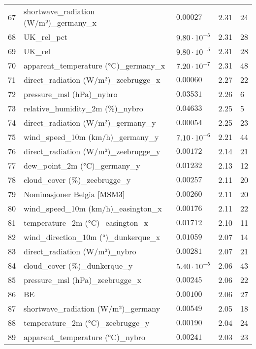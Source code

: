 \begin{table}[H]
\begin{tabular}{r l l l l}
        67 & shortwave\_radiation (W/m²)\_germany\_x & $0.00027$ & 2.31 & 24 \\
        68 & UK\_rel\_pct & $9.80 \cdot 10^{-5}$ & 2.31 & 28 \\
        69 & UK\_rel & $9.80 \cdot 10^{-5}$ & 2.31 & 28 \\
        70 & apparent\_temperature (°C)\_germany\_x & $7.20 \cdot 10^{-7}$ & 2.31 & 48 \\
        71 & direct\_radiation (W/m²)\_zeebrugge\_x & $0.00060$ & 2.27 & 22 \\
        72 & pressure\_msl (hPa)\_nybro & $0.03531$ & 2.26 & 6 \\
        73 & relative\_humidity\_2m (\%)\_nybro & $0.04633$ & 2.25 & 5 \\
        74 & direct\_radiation (W/m²)\_germany\_y & $0.00054$ & 2.25 & 23 \\
        75 & wind\_speed\_10m (km/h)\_germany\_y & $7.10 \cdot 10^{-6}$ & 2.21 & 44 \\
        76 & direct\_radiation (W/m²)\_zeebrugge\_y & $0.00172$ & 2.14 & 21 \\
        77 & dew\_point\_2m (°C)\_germany\_y & $0.01232$ & 2.13 & 12 \\
        78 & cloud\_cover (\%)\_zeebrugge\_y & $0.00257$ & 2.11 & 20 \\
        79 & Nominasjoner Belgia [MSM3] & $0.00260$ & 2.11 & 20 \\
        80 & wind\_speed\_10m (km/h)\_easington\_x & $0.00176$ & 2.11 & 22 \\
        81 & temperature\_2m (°C)\_easington\_x & $0.01712$ & 2.10 & 11 \\
        82 & wind\_direction\_10m (°)\_dunkerque\_x & $0.01059$ & 2.07 & 14 \\
        83 & direct\_radiation (W/m²)\_nybro & $0.00281$ & 2.07 & 21 \\
        84 & cloud\_cover (\%)\_dunkerque\_y & $5.40 \cdot 10^{-5}$ & 2.06 & 43 \\
        85 & pressure\_msl (hPa)\_zeebrugge\_x & $0.00245$ & 2.06 & 22 \\
        86 & BE & $0.00100$ & 2.06 & 27 \\
        87 & shortwave\_radiation (W/m²)\_germany & $0.00549$ & 2.05 & 18 \\
        88 & temperature\_2m (°C)\_zeebrugge\_y & $0.00190$ & 2.04 & 24 \\
        89 & apparent\_temperature (°C)\_nybro & $0.00241$ & 2.03 & 23 \\

\end{tabular}
\end{table}
